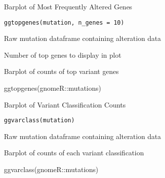 \documentclass[a4paper]{book}
\begin{document}
%
\begin{Description}\relax
Barplot of Most Frequently Altered Genes
\end{Description}
%
\begin{Usage}
\begin{verbatim}
ggtopgenes(mutation, n_genes = 10)
\end{verbatim}
\end{Usage}
%
\begin{Arguments}
\begin{ldescription}
\item[\code{mutation}] Raw mutation dataframe containing alteration data

\item[\code{n\_genes}] Number of top genes to display in plot
\end{ldescription}
\end{Arguments}
%
\begin{Value}
Barplot of counts of top variant genes
\end{Value}
%
\begin{Examples}
\begin{ExampleCode}
ggtopgenes(gnomeR::mutations)

\end{ExampleCode}
\end{Examples}
%
\begin{Description}\relax
Barplot of Variant Classification Counts
\end{Description}
%
\begin{Usage}
\begin{verbatim}
ggvarclass(mutation)
\end{verbatim}
\end{Usage}
%
\begin{Arguments}
\begin{ldescription}
\item[\code{mutation}] Raw mutation dataframe containing alteration data
\end{ldescription}
\end{Arguments}
%
\begin{Value}
Barplot of counts of each variant classification
\end{Value}
%
\begin{Examples}
\begin{ExampleCode}
ggvarclass(gnomeR::mutations)

\end{ExampleCode}
\end{Examples}
\end{document}

